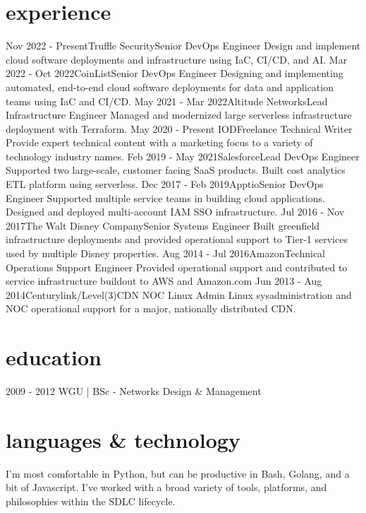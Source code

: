 \documentclass[]{mv_cv}
\begin{document}
\section{experience}
  \begin{explist}
    \expitem
    {Nov 2022 - Present}{Truffle Security}{Senior DevOps Engineer}
    {Design and implement cloud software deployments and infrastructure using IaC, CI/CD, and AI.}
    \expitem
    {Mar 2022 - Oct 2022}{CoinList}{Senior DevOps Engineer}
    {Designing and implementing automated, end-to-end cloud software deployments for data and application teams using IaC and CI/CD.}
    \expitem
    {May 2021 - Mar 2022}{Altitude Networks}{Lead Infrastructure Engineer}
    {Managed and modernized large serverless infrastructure deployment with Terraform.}
    \expitem
    {May 2020 - Present  }{IOD}{Freelance Technical Writer}
    {Provide expert technical content with a marketing focus to a variety of technology industry names.}
    \expitem
    {Feb 2019 - May 2021}{Salesforce}{Lead DevOps Engineer}
    {Supported two large-scale, customer facing SaaS products. Built cost analytics ETL platform using serverless.}
    \expitem
    {Dec 2017 - Feb 2019}{Apptio}{Senior DevOps Engineer}
    {Supported multiple service teams in building cloud applications. Designed and deployed multi-account IAM SSO infrastructure.}
    \expitem
    {Jul 2016 - Nov 2017}{The Walt Disney Company}{Senior Systems Engineer}
    {Built greenfield infrastructure deployments and provided operational support to Tier-1 services used by multiple Disney properties.}
    \expitem
    {Aug 2014 - Jul 2016}{Amazon}{Technical Operations Support Engineer}
    {Provided operational support and contributed to service infrastructure buildout to AWS and Amazon.com}
   \expitem
    {Jun 2013 - Aug 2014}{Centurylink/Level(3)}{CDN NOC Linux Admin}
    {Linux sysadministration and NOC operational support for a major, nationally distributed CDN.}
  \end{explist}

\section{education}
\begin{content}
  {2009 - 2012 WGU | BSc - Networks Design \& Management}
\end{content}

\section{languages \& technology}
\begin{content}
  {I'm most comfortable in Python, but can be productive in Bash, Golang, and a bit of Javascript. I've worked with a broad variety of tools, platforms, and philosophies within the SDLC lifecycle.}
\end{content}

\thispagestyle{empty}
\end{document}
